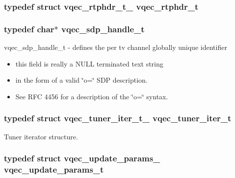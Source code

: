 \subsubsection{\setlength{\rightskip}{0pt plus 5cm}typedef struct \bf{vqec\_\-rtphdr\_\-t\_\-}  \bf{vqec\_\-rtphdr\_\-t}}\label{group__structs_g959a9f97647459e6d8d875347a828718}


\subsubsection{\setlength{\rightskip}{0pt plus 5cm}typedef char$\ast$ \bf{vqec\_\-sdp\_\-handle\_\-t}}\label{group__structs_g99080185a89f9a9a14621886d40ad20d}


vqec\_\-sdp\_\-handle\_\-t - defines the per tv channel globally unique identifier\begin{itemize}
\item this field is really a NULL terminated text string\item in the form of a valid \char`\"{}o=\char`\"{} SDP description.\item See RFC 4456 for a description of the \char`\"{}o=\char`\"{} syntax. \end{itemize}
\subsubsection{\setlength{\rightskip}{0pt plus 5cm}typedef struct \bf{vqec\_\-tuner\_\-iter\_\-t\_\-}  \bf{vqec\_\-tuner\_\-iter\_\-t}}\label{group__structs_g37f72b7881759cca0d25c70e93fdca16}


Tuner iterator structure. 

\subsubsection{\setlength{\rightskip}{0pt plus 5cm}typedef struct vqec\_\-update\_\-params\_\- \bf{vqec\_\-update\_\-params\_\-t}}\label{group__structs_gaa6ff9543c48fe548fd04ca654fdc03c}




